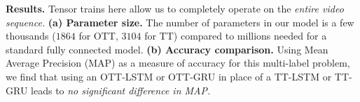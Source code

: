     {\bf Results.} Tensor trains here allow us to completely operate on the \textit{entire video sequence.}
    {\bf (a) Parameter size.}
    The number of parameters in our model is a few thousands ($1864$ for OTT, $3104$ for TT)
    compared to millions needed for a standard fully connected model.
    {\bf (b) Accuracy comparison.}
    Using Mean Average Precision (MAP) as a measure of accuracy for this multi-label problem, we
    find that using an OTT-LSTM or OTT-GRU in place of a TT-LSTM or TT-GRU leads to
    \textit{no significant difference in MAP.} 
	








